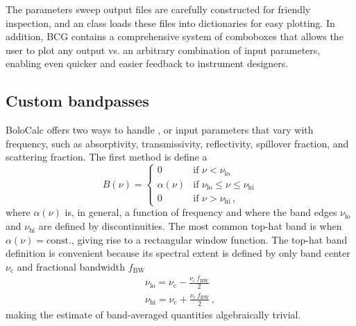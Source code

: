 The parameters sweep output files are carefully constructed for friendly inspection, and an  class loads these files into dictionaries for easy plotting. In addition, BCG contains a comprehensive system of comboboxes that allows the user to plot any output vs. an arbitrary combination of input parameters, enabling even quicker and easier feedback to instrument designers.


\subsection{Custom bandpasses}
\label{sec:bolocalc_custom_bands}

BoloCalc offers two ways to handle , or input parameters that vary with frequency, such as absorptivity, transmissivity, reflectivity, spillover fraction, and scattering fraction. The first method is define a 
\begin{equation}
    B ( \nu) = 
    \begin{cases}
        0    & \text{if } \nu < \nu_{\mathrm{lo}} \\
        \alpha(\nu) & \text{if } \nu_{\mathrm{lo}} \leq \nu \leq \nu_{\mathrm{hi}} \\
        0    & \text{if } \nu > \nu_{\mathrm{hi}} \, ,
    \end{cases}
    \label{eq:bolocalc_tophat_band}
\end{equation}
where $\alpha(\nu)$ is, in general, a function of frequency and where the band edges $\nu_{\mathrm{lo}}$ and $\nu_{\mathrm{hi}}$ are defined by discontinuities. The most common top-hat band is when $\alpha(\nu) = \mathrm{const.}$, giving rise to a rectangular window function. The top-hat band definition is convenient because its spectral extent is defined by only band center $\nu_{\mathrm{c}}$ and fractional bandwidth $f_{\mathrm{BW}}$
\begin{align}
    \nu_{\mathrm{lo}} = \nu_{\mathrm{c}} - \frac{ \nu_{\mathrm{c}} \, f_{\mathrm{BW}}}{2} \label{eq:band_lo} \\
    \nu_{\mathrm{hi}} = \nu_{\mathrm{c}} + \frac{ \nu_{\mathrm{c}} \, f_{\mathrm{BW}}}{2} \label{eq:band_hi} \, ,
\end{align}
making the estimate of band-averaged quantities algebraically trivial.

